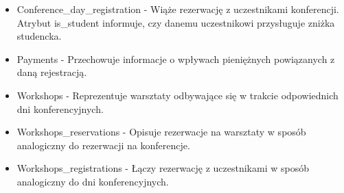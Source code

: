 \documentclass{article}
\begin{document}
\begin{itemize}
            \item Conference\_day\_registration - Wiąże rezerwację z uczestnikami konferencji. Atrybut is\_student informuje, czy danemu uczestnikowi przysługuje zniżka studencka. 
            
            \item Payments - Przechowuje informacje o wpływach pieniężnych powiązanych z daną rejestracją. 
            
            \item Workshops - Reprezentuje warsztaty odbywające się w trakcie odpowiednich dni konferencyjnych.
            
            \item Workshops\_reservations - Opisuje rezerwacje na warsztaty w sposób analogiczny do rezerwacji na konferencje. 
            
            \item Workshops\_registrations - Łączy rezerwację z uczestnikami w sposób analogiczny do dni konferencyjnych.
            
        \end{itemize}
        
    
\end{document}
